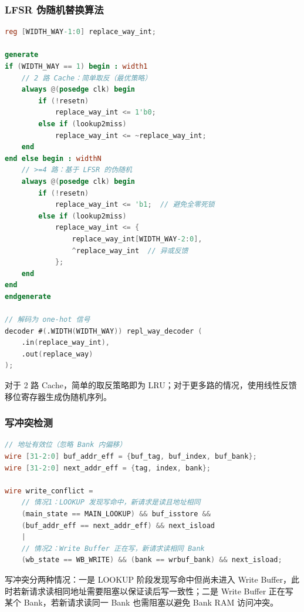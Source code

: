 \subsubsection{LFSR 伪随机替换算法}

\begin{lstlisting}[language=Verilog, caption=LFSR 替换算法实现]
reg [WIDTH_WAY-1:0] replace_way_int;

generate
if (WIDTH_WAY == 1) begin : width1
    // 2 路 Cache：简单取反（最优策略）
    always @(posedge clk) begin
        if (!resetn)
            replace_way_int <= 1'b0;
        else if (lookup2miss)
            replace_way_int <= ~replace_way_int;
    end
end else begin : widthN
    // >=4 路：基于 LFSR 的伪随机
    always @(posedge clk) begin
        if (!resetn)
            replace_way_int <= 'b1;  // 避免全零死锁
        else if (lookup2miss)
            replace_way_int <= {
                replace_way_int[WIDTH_WAY-2:0],
                ^replace_way_int  // 异或反馈
            };
    end
end
endgenerate

// 解码为 one-hot 信号
decoder #(.WIDTH(WIDTH_WAY)) repl_way_decoder (
    .in(replace_way_int),
    .out(replace_way)
);
\end{lstlisting}

对于 2 路 Cache，简单的取反策略即为 LRU；对于更多路的情况，使用线性反馈移位寄存器生成伪随机序列。

\subsubsection{写冲突检测}

\begin{lstlisting}[language=Verilog, caption=写冲突检测逻辑]
// 地址有效位（忽略 Bank 内偏移）
wire [31-2:0] buf_addr_eff = {buf_tag, buf_index, buf_bank};
wire [31-2:0] next_addr_eff = {tag, index, bank};

wire write_conflict = 
    // 情况1：LOOKUP 发现写命中，新请求是读且地址相同
    (main_state == MAIN_LOOKUP) && buf_isstore && 
    (buf_addr_eff == next_addr_eff) && next_isload
    |
    // 情况2：Write Buffer 正在写，新请求读相同 Bank
    (wb_state == WB_WRITE) && (bank == wrbuf_bank) && next_isload;
\end{lstlisting}

写冲突分两种情况：一是 LOOKUP 阶段发现写命中但尚未进入 Write Buffer，此时若新请求读相同地址需要阻塞以保证读后写一致性；二是 Write Buffer 正在写某个 Bank，若新请求读同一 Bank 也需阻塞以避免 Bank RAM 访问冲突。

